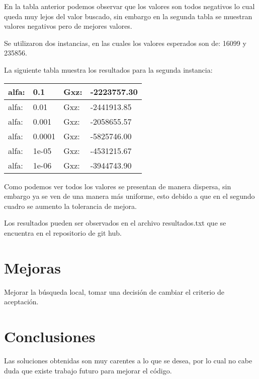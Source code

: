 \documentclass{article}
\theoremstyle{mytheoremstyle}
\theoremstyle{mytheoremstyle}
\theoremstyle{myproblemstyle}
\begin{document}
   En la tabla anterior podemos observar que los valores son todos negativos lo cual queda muy lejos del valor buscado, sin embargo en la segunda tabla se muestran valores negativos pero de mejores valores.
   
   Se utilizaron dos instancias, en las cuales los valores esperados son de: 16099 y 235856.
   
   La siguiente tabla muestra los resultados para la segunda instancia:
   
   \begin{table}[h!]
   	\begin{tabular}{|l|l|l|l|}
   		\hline
   		alfa: & 0.1    & Gxz: & -2223757.30 \\ \hline
   		alfa: & 0.01   & Gxz: & -2441913.85 \\ \hline
   		alfa: & 0.001  & Gxz: & -2058655.57 \\ \hline
   		alfa: & 0.0001 & Gxz: & -5825746.00 \\ \hline
   		alfa: & 1e-05  & Gxz: & -4531215.67 \\ \hline
   		alfa: & 1e-06  & Gxz: & -3944743.90 \\ \hline
   	\end{tabular}
   \end{table}
  
    Como podemos ver todos los valores se presentan de manera dispersa, sin embargo ya se ven de una manera más uniforme, esto debido a que en el segundo cuadro se aumento la tolerancia de mejora.
    
    Los resultados pueden ser observados en el archivo resultados.txt que se encuentra en el repositorio de git hub.
    
    \section{Mejoras}
    
    Mejorar la búsqueda local, tomar una decisión de cambiar el criterio de aceptación.
    \section{Conclusiones} 
   	Las soluciones obtenidas son muy carentes a lo que se desea, por lo cual no cabe duda que existe trabajo futuro para mejorar el código.
    
    
    
\end{document}
